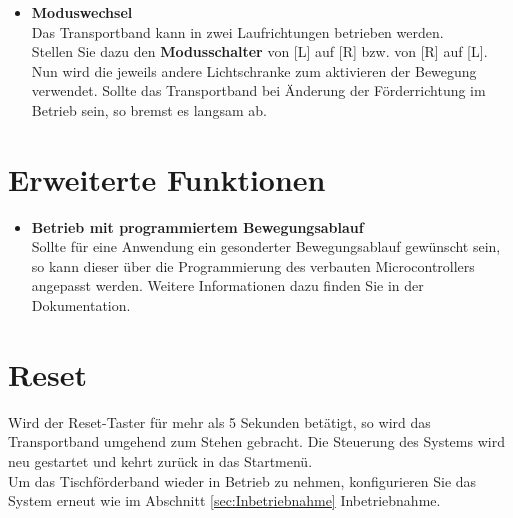 \begin{itemize}
	\item \textbf{Moduswechsel}\\
	Das Transportband kann in zwei Laufrichtungen betrieben werden.\\
	Stellen Sie dazu den \textbf{Modusschalter}  von [L] auf [R] bzw. von [R] auf [L].
	Nun wird die jeweils andere Lichtschranke zum aktivieren der Bewegung verwendet.
	Sollte das Transportband bei Änderung der Förderrichtung im Betrieb sein, so bremst es langsam ab.
	
\end{itemize}

\section{Erweiterte Funktionen}

\begin{itemize}
	
	\item \textbf{Betrieb mit programmiertem Bewegungsablauf} \\ 
	Sollte für eine Anwendung ein gesonderter Bewegungsablauf gewünscht sein, so kann dieser über die Programmierung des verbauten Microcontrollers angepasst werden. 
	Weitere Informationen dazu finden Sie in der Dokumentation.
	
\end{itemize}

\section{Reset}
Wird der Reset-Taster für mehr als 5 Sekunden betätigt, so wird das Transportband umgehend zum Stehen gebracht. Die Steuerung des Systems wird neu gestartet und kehrt zurück in das Startmenü.\\
Um das Tischförderband wieder in Betrieb zu nehmen, konfigurieren Sie das System erneut wie im Abschnitt \ref{sec:Inbetriebnahme} Inbetriebnahme.